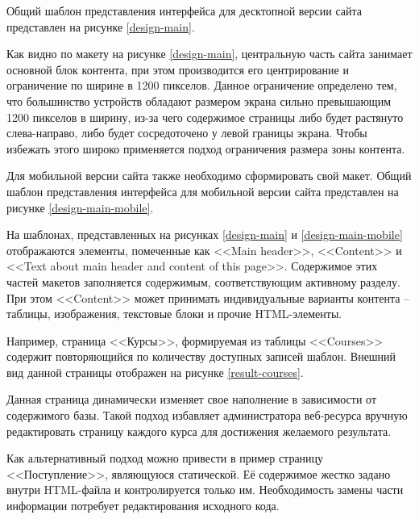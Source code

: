 
Общий шаблон представления интерфейса для десктопной версии сайта представлен на рисунке \ref{design-main}.


Как видно по макету на рисунке \ref{design-main}, центральную часть сайта занимает основной блок контента, при этом производится его центрирование и ограничение по ширине в 1200 пикселов. 
Данное ограничение определено тем, что большинство устройств обладают размером экрана сильно превышающим 1200 пикселов в ширину, из-за чего содержимое страницы либо будет растянуто слева-направо, либо будет сосредоточено у левой границы экрана.
Чтобы избежать этого широко применяется подход ограничения размера зоны контента.

Для мобильной версии сайта также необходимо сформировать свой макет.
Общий шаблон представления интерфейса для мобильной версии сайта представлен на рисунке \ref{design-main-mobile}.


На шаблонах, представленных на рисунках \ref{design-main} и \ref{design-main-mobile} отображаются элементы, помеченные как <<Main header>>, <<Content>> и <<Text about main header and content of this page>>.
Содержимое этих частей макетов заполняется содержимым, соответствующим активному разделу.
При этом <<Content>> может принимать индивидуальные варианты контента -- таблицы, изображения, текстовые блоки и прочие HTML-элементы.

Например, страница <<Курсы>>, формируемая из таблицы <<Courses>> содержит повторяющийся по количеству доступных записей шаблон.
Внешний вид данной страницы отображен на рисунке \ref{result-courses}.


Данная страница динамически изменяет свое наполнение в зависимости от содержимого базы.
Такой подход избавляет администратора веб-ресурса вручную редактировать страницу каждого курса для достижения желаемого результата.

Как альтернативный подход можно привести в пример страницу <<Поступление>>, являющуюся статической.
Её содержимое жестко задано внутри HTML-файла и контролируется только им.
Необходимость замены части информации потребует редактирования исходного кода.

